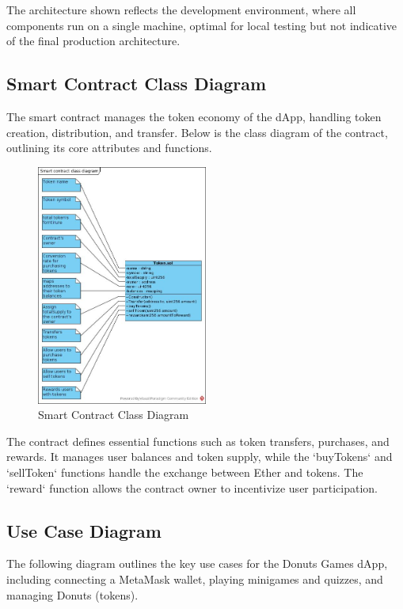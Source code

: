 \documentclass[../main.tex]{subfiles}
\begin{document}
The architecture shown reflects the development environment, where all components run on a single machine, optimal for local testing but not indicative of the final production architecture.


\subsection{Smart Contract Class Diagram}
The smart contract manages the token economy of the dApp, handling token creation, distribution, and transfer. Below is the class diagram of the contract, outlining its core attributes and functions.

\begin{figure}[htbp]
    \centering
    \includegraphics[width=0.5\textwidth]{../src/diagrams/Smart contract class diagram.jpg}
    \caption{Smart Contract Class Diagram}
    \label{fig:ClassDiag}
\end{figure}

The contract defines essential functions such as token transfers, purchases, and rewards. It manages user balances and token supply, while the `buyTokens` and `sellToken` functions handle the exchange between Ether and tokens. The `reward` function allows the contract owner to incentivize user participation.


\subsection{Use Case Diagram}
The following diagram outlines the key use cases for the Donuts Games dApp, including connecting a MetaMask wallet, playing minigames and quizzes, and managing Donuts (tokens).
\end{document}
